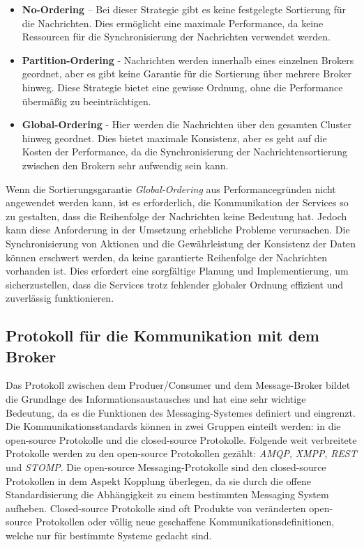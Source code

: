 \begin{itemize}
	\item \textbf{No-Ordering} – Bei dieser Strategie gibt es keine festgelegte Sortierung für die Nachrichten. Dies ermöglicht eine maximale Performance, da keine Ressourcen für die Synchronisierung der Nachrichten verwendet werden.
	\item \textbf{Partition-Ordering} - Nachrichten werden innerhalb eines einzelnen Brokers geordnet, aber es gibt keine Garantie für die Sortierung über mehrere Broker hinweg. Diese Strategie bietet eine gewisse Ordnung, ohne die Performance übermäßig zu beeinträchtigen.
	\item \textbf{Global-Ordering} - Hier werden die Nachrichten über den gesamten Cluster hinweg geordnet. Dies bietet maximale Konsistenz, aber es geht auf die Kosten der Performance, da die Synchronisierung der Nachrichtensortierung zwischen den Brokern sehr aufwendig sein kann.
\end{itemize}

Wenn die Sortierungsgarantie \emph{Global-Ordering} aus Performancegründen nicht angewendet werden kann, ist es erforderlich, die Kommunikation der Services so zu gestalten, dass die Reihenfolge der Nachrichten keine Bedeutung hat. Jedoch kann diese Anforderung in der Umsetzung erhebliche Probleme verursachen. Die Synchronisierung von Aktionen und die Gewährleistung der Konsistenz der Daten können erschwert werden, da keine garantierte Reihenfolge der Nachrichten vorhanden ist. Dies erfordert eine sorgfältige Planung und Implementierung, um sicherzustellen, dass die Services trotz fehlender globaler Ordnung effizient und zuverlässig funktionieren. \cite{fuFairComparisonMessage2021}

\subsection{Protokoll für die Kommunikation mit dem Broker}

Das Protokoll zwischen dem Produer/Consumer und dem Message-Broker bildet die Grundlage des Informationsaustausches und hat eine sehr wichtige Bedeutung, da es die Funktionen des Messaging-Systemes definiert und eingrenzt. Die Kommunikationsstandards können in zwei Gruppen einteilt werden: in die open-source Protokolle und die closed-source Protokolle. Folgende weit verbreitete Protokolle werden zu den open-source Protokollen gezählt: \emph{AMQP}, \emph{XMPP}, \emph{REST} und \emph{STOMP}.  Die open-source Messaging-Protokolle sind den closed-source Protokollen in dem Aspekt Kopplung überlegen, da sie durch die offene Standardisierung die Abhängigkeit zu einem bestimmten Messaging System aufheben. Closed-source Protokolle sind oft Produkte von veränderten open-source Protokollen oder völlig neue geschaffene Kommunikationsdefinitionen, welche nur für bestimmte Systeme gedacht sind. \cite{fuFairComparisonMessage2021}


